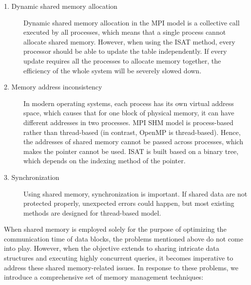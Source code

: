 \begin{description}
	\item [1. Dynamic shared memory allocation] Dynamic shared memory allocation in the MPI model is a collective call executed by all processes, which means that a single process cannot allocate shared memory. However, when using the ISAT method, every processor should be able to update the table independently. If every update requires all the processes to allocate memory together, the efficiency of the whole system will be severely slowed down.
	\item [2. Memory address inconsistency] In modern operating systems, each process has its own virtual address space, which causes that for one block of physical memory, it can have different addresses in two processes. MPI SHM model is process-based rather than thread-based (in contrast, OpenMP is thread-based). Hence, the addresses of shared memory cannot be passed across processes, which makes the pointer cannot be used. ISAT is built based on a binary tree, which depends on the indexing method of the pointer.
	\item [3. Synchronization] Using shared memory, synchronization is important. If shared data are not protected properly, unexpected errors could happen, but most existing methods are designed for thread-based model.
\end{description}


When shared memory is employed solely for the purpose of optimizing the communication time of data blocks, the problems mentioned above do not come into play. However, when the objective extends to sharing intricate data structures and executing highly concurrent queries, it becomes imperative to address these shared memory-related issues. In response to these problems, we introduce a comprehensive set of memory management techniques:



